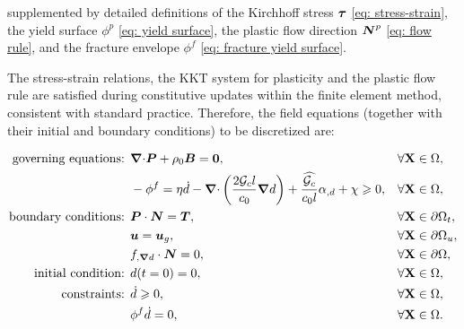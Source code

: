 supplemented by detailed definitions of the Kirchhoff stress $\boldsymbol{\tau}$ \eqref{eq: stress-strain}, the yield surface $\phi^p$ \eqref{eq: yield surface}, the plastic flow direction $\boldsymbol{N}^p$ \eqref{eq: flow rule}, and the fracture envelope $\phi^f$ \eqref{eq: fracture yield surface}.

The stress-strain relations, the KKT system for plasticity and the plastic flow rule are satisfied during constitutive updates within the finite element method, consistent with standard practice. Therefore, the field equations (together with their initial and boundary conditions) to be discretized are:

\begin{mdframed}[
    frametitle={The strong form},
    frametitlebackgroundcolor=gray!20,
    backgroundcolor=gray!5,
    linewidth=0pt,
    nobreak=true
  ]
  \vspace{-0.5em}
  \begin{align*}
    \text{governing equations: } & {\boldsymbol{\nabla} \cdot} \boldsymbol{P} + \rho_0 \boldsymbol{B} = \boldsymbol{0},                                                                                                       &  & \forall \textbf{X} \in \Omega,           \\
                                 & -\phi^f = \eta \dot{d} - {\boldsymbol{\nabla} \cdot} \left( \dfrac{2 {\mathcal{G}_c} l}{c_0} \boldsymbol{\nabla} d \right) + \dfrac{\widehat{{\mathcal{G}_c}}}{c_0 l}\alpha_{,d} + \chi \geqslant 0, &  & \forall \textbf{X} \in \Omega,           \\
    \text{boundary conditions: } & \boldsymbol{P} \cdot \boldsymbol{N} = \boldsymbol{T},                                                                                                                        &  & \forall \textbf{X} \in {\partial \Omega}_t, \\
                                 & \boldsymbol{u} = \boldsymbol{u}_g,                                                                                                                                 &  & \forall \textbf{X} \in {\partial \Omega}_u, \\
                                 & f_{, \boldsymbol{\nabla} d} \cdot \boldsymbol{N} = 0 ,                                                                                                                 &  & \forall \textbf{X} \in {\partial \Omega},   \\
    \text{initial condition: }   & d(t=0) = 0,                                                                                                                                    &  & \forall \textbf{X} \in \Omega,           \\
    \text{constraints: }         & \dot{d} \geqslant 0,                                                                                                                           &  & \forall \textbf{X} \in \Omega,           \\
                                 & \phi^f \dot{d} = 0,                                                                                                                            &  & \forall \textbf{X} \in \Omega.
  \end{align*}
\end{mdframed}

